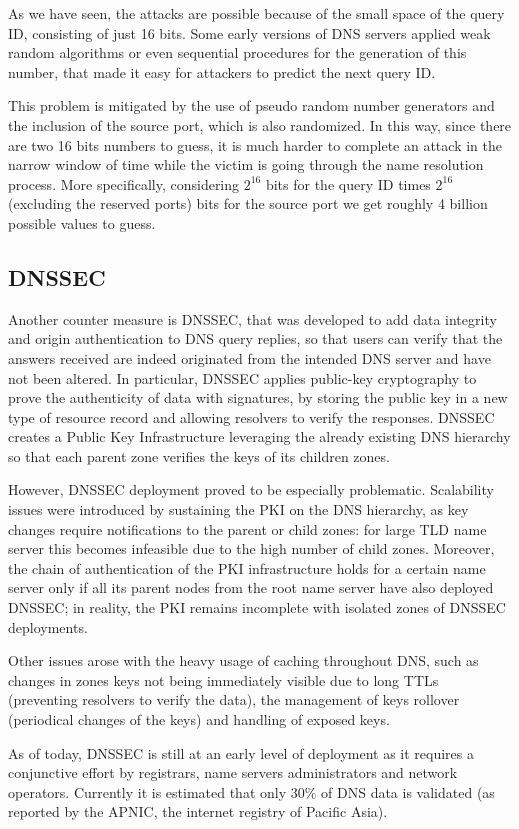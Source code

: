 \documentclass[11pt,a4paper]{article}
\begin{document}
\noindent
As we have seen, the attacks are possible because of the small space of the query ID, consisting of just 16 bits. Some early versions of DNS servers applied weak random algorithms or even sequential procedures for the generation of this number, that made it easy for attackers to predict the next query ID.

\noindent
This problem is mitigated by the use of pseudo random number generators and the inclusion of the source port, which is also randomized. In this way, since there are two 16 bits numbers to guess, it is much harder to complete an attack in the narrow window of time while the victim is going through the name resolution process. More specifically, considering $2^{16}$ bits for the query ID times $2^{16}$ (excluding the reserved ports) bits for the source port we get roughly 4 billion possible values to guess.

\subsection{DNSSEC}

Another counter measure is DNSSEC, that was developed to add data integrity and origin authentication to DNS query replies, so that users can verify that the answers received are indeed originated from the intended DNS server and have not been altered. In particular, DNSSEC applies public-key cryptography to prove the authenticity of data with signatures, by storing the public key in a new type of resource record and allowing resolvers to verify the responses. DNSSEC creates a Public Key Infrastructure leveraging the already existing DNS hierarchy so that each parent zone verifies the keys of its children zones.

\hfill \break
\noindent
However, DNSSEC deployment proved to be especially problematic. Scalability issues were introduced by sustaining the PKI on the DNS hierarchy, as key changes require notifications to the parent or child zones: for large TLD name server this becomes infeasible due to the high number of child zones. Moreover, the chain of authentication of the PKI infrastructure holds for a certain name server only if all its parent nodes from the root name server have also deployed DNSSEC; in reality, the PKI remains incomplete with isolated zones of DNSSEC deployments.

\noindent
Other issues arose with the heavy usage of caching throughout DNS, such as changes in zones keys not being immediately visible due to long TTLs (preventing resolvers to verify the data), the management of keys rollover (periodical changes of the keys) and handling of exposed keys.

\hfill \break
\noindent
As of today, DNSSEC is still at an early level of deployment as it requires a conjunctive effort by registrars, name servers administrators and network operators. Currently it is estimated that only 30\% of DNS data is validated (as reported by the APNIC, the internet registry of Pacific Asia).
\end{document}
